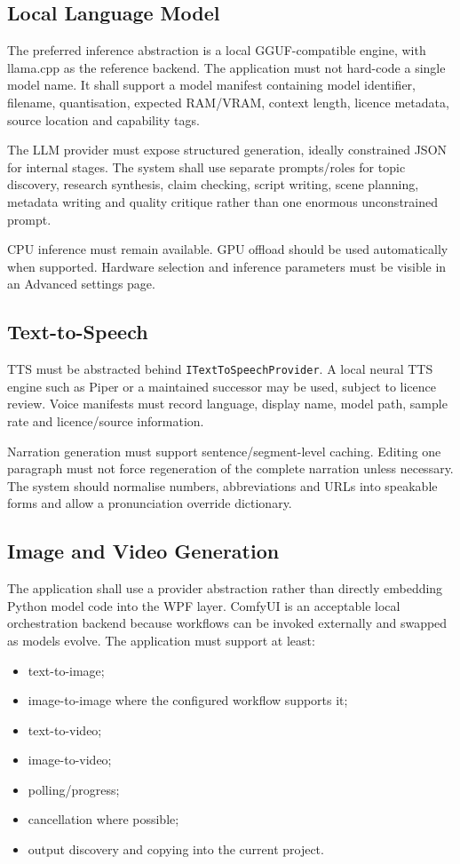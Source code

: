 \documentclass[10pt,journal,compsoc]{IEEEtran}
\begin{document}
\subsection{Local Language Model}

The preferred inference abstraction is a local GGUF-compatible engine, with llama.cpp as the reference backend. The application must not hard-code a single model name. It shall support a model manifest containing model identifier, filename, quantisation, expected RAM/VRAM, context length, licence metadata, source location and capability tags.

The LLM provider must expose structured generation, ideally constrained JSON for internal stages. The system shall use separate prompts/roles for topic discovery, research synthesis, claim checking, script writing, scene planning, metadata writing and quality critique rather than one enormous unconstrained prompt.

CPU inference must remain available. GPU offload should be used automatically when supported. Hardware selection and inference parameters must be visible in an Advanced settings page.

\subsection{Text-to-Speech}

TTS must be abstracted behind \texttt{ITextToSpeechProvider}. A local neural TTS engine such as Piper or a maintained successor may be used, subject to licence review. Voice manifests must record language, display name, model path, sample rate and licence/source information.

Narration generation must support sentence/segment-level caching. Editing one paragraph must not force regeneration of the complete narration unless necessary. The system should normalise numbers, abbreviations and URLs into speakable forms and allow a pronunciation override dictionary.

\subsection{Image and Video Generation}

The application shall use a provider abstraction rather than directly embedding Python model code into the WPF layer. ComfyUI is an acceptable local orchestration backend because workflows can be invoked externally and swapped as models evolve. The application must support at least:
\begin{itemize}
    \item text-to-image;
    \item image-to-image where the configured workflow supports it;
    \item text-to-video;
    \item image-to-video;
    \item polling/progress;
    \item cancellation where possible;
    \item output discovery and copying into the current project.
\end{itemize}
\end{document}
